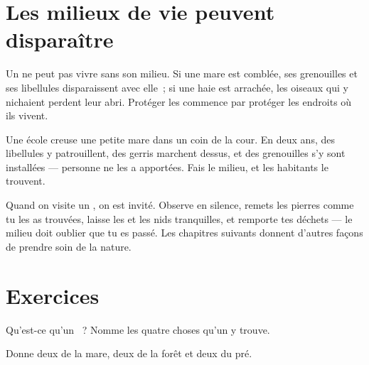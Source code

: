 \section{Les milieux de vie peuvent disparaître}

\begin{proposition}\label{prop:g2:where-animals-live:loss}
Un  ne peut pas vivre sans son milieu. Si une mare est
comblée, ses grenouilles et ses libellules disparaissent avec elle~;
si une haie est arrachée, les oiseaux qui y nichaient perdent leur
abri. Protéger les  commence par protéger les endroits où ils
vivent.
\end{proposition}
\admitted

\begin{example}\label{ex:g2:where-animals-live:schoolpond}
Une école creuse une petite mare dans un coin de la cour. En deux
ans, des libellules y patrouillent, des gerris marchent dessus, et
des grenouilles s'y sont installées --- personne ne les a apportées.
Fais le milieu, et les habitants le trouvent.
\end{example}

\begin{remark}\label{rem:g2:where-animals-live:respect}
Quand on visite un , on est invité. Observe en
silence, remets les pierres comme tu les as trouvées, laisse les
 et les nids tranquilles, et remporte tes déchets --- le milieu
doit oublier que tu es passé. Les chapitres suivants donnent
d'autres façons de prendre soin de la nature.
\end{remark}

\section{Exercices}

\begin{exercise}[$\star$]\label{exo:g2:where-animals-live:1}
Qu'est-ce qu'un ~? Nomme les quatre choses qu'un 
y trouve.
\end{exercise}

\begin{exercise}[$\star$]\label{exo:g2:where-animals-live:2}
Donne deux  de la mare, deux de la forêt et deux du pré.
\end{exercise}

